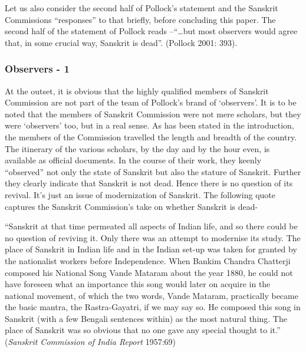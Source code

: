 Let us also consider the second half of Pollock’s statement and the Sanskrit Commissions “responses” to that briefly, before concluding this paper. The second half of the statement of Pollock reads –“…but most observers would agree that, in some crucial way, Sanskrit is dead”. (Pollock 2001: 393). 

\makeatletter
\renewcommand\thesubsubsection{\thesubsection.\@alph\c@subsubsection}
\makeatother

\subsubsection{Observers - 1}

At the outset, it is obvious that the highly qualified members of Sanskrit Commission are not part of the team of Pollock’s brand of ‘observers’. It is to be noted that the members of Sanskrit Commission were not mere scholars, but they were ‘observers’ too, but in a real sense. As has been stated in the introduction, the members of the Commission travelled the length and breadth of the country. The itinerary of the various scholars, by the day and by the hour even, is available as official documents. In the course of their work, they keenly “observed” not only the state of Sanskrit but also the stature of Sanskrit. Further they clearly indicate that Sanskrit is not dead. Hence there is no question of its revival. It’s just an issue of  modernization of Sanskrit. The following quote captures the Sanskrit Commission’s take on whether Sanskrit is dead-
\begin{myquote}
\eleven
“Sanskrit at that time permeated all aspects of Indian life, and so there could be no question of reviving it. Only there was an attempt to modernise its study. The place of Sanskrit in Indian life and in the Indian set-up was taken for granted by the nationalist workers before Independence. When Bankim Chandra Chatterji composed his National Song Vande Mataram about the year 1880, he could not have foreseen what an importance this song would later on acquire in the national movement, of which the two words, Vande Mataram, practically became the basic mantra, the Rastra-Gayatri, if we may say so. He composed this song in Sanskrit (with a few Bengali sentences within) as the most natural thing. The place of Sanskrit was so obvious that no one gave any special thought to it.” \hfill({\sl Sanskrit Commission of India Report} 1957:69)
\end{myquote}

